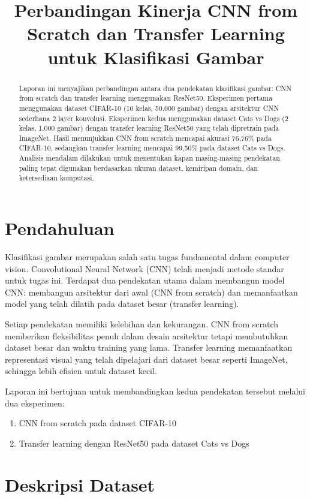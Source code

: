 \documentclass[conference]{IEEEtran}
\title{Perbandingan Kinerja CNN from Scratch dan Transfer Learning untuk Klasifikasi Gambar}
\author{
  \IEEEauthorblockN{~}
  \IEEEauthorblockA{M. Faridh Maulana \textit{452024611065}\\
    Program Studi Teknik Informatika, Universitas Darussalam Gontor\\
    Email: mfaridhmaulana47@student.cs.unida.gontor.ac.id\\
  }
}
\begin{document}
\maketitle

\begin{abstract}
	Laporan ini menyajikan perbandingan antara dua pendekatan klasifikasi gambar: CNN from scratch dan transfer learning menggunakan ResNet50. Eksperimen pertama menggunakan dataset CIFAR-10 (10 kelas, 50.000 gambar) dengan arsitektur CNN sederhana 2 layer konvolusi. Eksperimen kedua menggunakan dataset Cats vs Dogs (2 kelas, 1.000 gambar) dengan transfer learning ResNet50 yang telah dipretrain pada ImageNet. Hasil menunjukkan CNN from scratch mencapai akurasi 76,76\% pada CIFAR-10, sedangkan transfer learning mencapai 99,50\% pada dataset Cats vs Dogs. Analisis mendalam dilakukan untuk menentukan kapan masing-masing pendekatan paling tepat digunakan berdasarkan ukuran dataset, kemiripan domain, dan ketersediaan komputasi.
\end{abstract}

\section{Pendahuluan}
Klasifikasi gambar merupakan salah satu tugas fundamental dalam computer vision. Convolutional Neural Network (CNN) telah menjadi metode standar untuk tugas ini. Terdapat dua pendekatan utama dalam membangun model CNN: membangun arsitektur dari awal (CNN from scratch) dan memanfaatkan model yang telah dilatih pada dataset besar (transfer learning).

Setiap pendekatan memiliki kelebihan dan kekurangan. CNN from scratch memberikan fleksibilitas penuh dalam desain arsitektur tetapi membutuhkan dataset besar dan waktu training yang lama. Transfer learning memanfaatkan representasi visual yang telah dipelajari dari dataset besar seperti ImageNet, sehingga lebih efisien untuk dataset kecil.

Laporan ini bertujuan untuk membandingkan kedua pendekatan tersebut melalui dua eksperimen:
\begin{enumerate}
	\item CNN from scratch pada dataset CIFAR-10
	\item Transfer learning dengan ResNet50 pada dataset Cats vs Dogs
\end{enumerate}

\section{Deskripsi Dataset}
\end{document}
